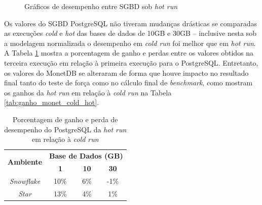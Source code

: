 \begin{figure}[t]
        \centering
        \caption{Gráficos de desempenho entre SGBD sob \textit{hot run}}
        \label{fig:qph_sgbd_hot}
\end{figure}

Os valores do SGBD PostgreSQL não tiveram mudanças drásticas se comparadas as execuções \textit{cold} e \textit{hot} das bases de dados de 10GB e 30GB -- inclusive nesta sob a modelagem normalizada o desempenho em \textit{cold run} foi melhor que em \textit{hot run}. A Tabela \ref{tab:ganho_postgresql_cold_hot} mostra a porcentagem de ganho e perdas entre os valores obtidos na terceira execução em relação à primeira execução para o PostgreSQL. Entretanto, os valores do MonetDB se alteraram de forma que houve impacto no resultado final tanto do teste de força como no cálculo final de \textit{benchmark}, como mostram os ganhos da \textit{hot run} em relação à \textit{cold run} na Tabela \ref{tab:ganho_monet_cold_hot}.

\begin{table}[htp]
        \centering
        \caption{Porcentagem de ganho e perda de desempenho do PostgreSQL da \textit{hot run} em relação à \textit{cold run}}
        \label{tab:ganho_postgresql_cold_hot}
        \begin{tabular}{|c|c|c|c|}
        \hline
        \multirow{2}{*}{\textbf{Ambiente}} & \multicolumn{3}{c|}{\textbf{Base de Dados (GB)}} \\ \cline{2-4} 
        & \textbf{1}     & \textbf{10}    & \textbf{30}    \\ \hline
        \textit{Snowflake}                 & 10\%           & 6\%            & -1\%           \\ \hline
        \textit{Star}                      & 13\%           & 4\%            & 1\%            \\ \hline
        \end{tabular}
\end{table}


